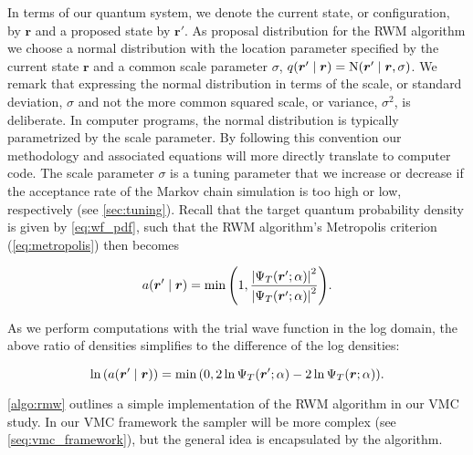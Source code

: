 In terms of our quantum system, we denote the current state, or configuration, by $\bm{r}$ and a proposed state by $\bm{r}'$. As proposal distribution for the RWM algorithm we choose a normal distribution with the location parameter specified by the current state $\bm{r}$ and a common scale parameter $\sigma$, $q \qty(\bm{r}' \mid \bm{r}) = \mathrm{N} \qty(\bm{r}' \mid \bm{r}, \sigma)$. We remark that expressing the normal distribution in terms of the scale, or standard deviation, $\sigma$ and not the more common squared scale, or variance, $\sigma^2$, is deliberate. In computer programs, the normal distribution is typically parametrized by the scale parameter. By following this convention our methodology and associated equations will more directly translate to computer code. The scale parameter $\sigma$ is a tuning parameter that we increase or decrease if the acceptance rate of the Markov chain simulation is too high or low, respectively (see \autoref{sec:tuning}). Recall that the target quantum probability density is given by \autoref{eq:wf_pdf}, such that the RWM algorithm's Metropolis criterion (\autoref{eq:metropolis}) then becomes

\begin{equation*}
    a \qty(\bm{r}' \mid \bm{r}) = \min \qty(1, \frac{\abs{\Psi_T \qty(\bm{r}';\alpha)}^2}{\abs{\Psi_T \qty(\bm{r}';\alpha)}^2}).
\end{equation*}

As we perform computations with the trial wave function in the log domain, the above ratio of densities simplifies to the difference of the log densities:

\begin{equation}\label{eq:log_rwm}
    \ln \qty(a \qty(\bm{r}' \mid \bm{r})) = \min \qty(0, 2 \ln \Psi_T \qty(\bm{r}';\alpha) - 2 \ln \Psi_T \qty(\bm{r};\alpha)).
\end{equation}

\autoref{algo:rmw} outlines a simple implementation of the RWM algorithm in our VMC study. In our VMC framework the sampler will be more complex (see \autoref{seq:vmc_framework}), but the general idea is encapsulated by the algorithm. 

